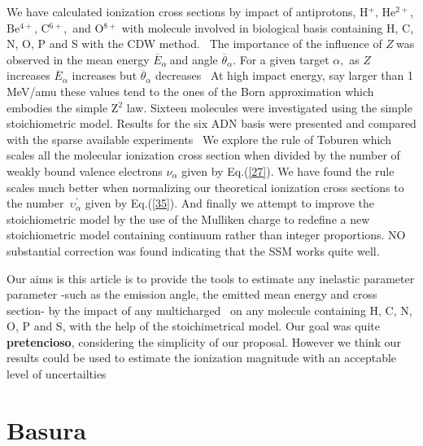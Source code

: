 \documentclass[preprint,showpacs,pra]{revtex4}
\begin{document}
We have calculated ionization cross sections by impact of antiprotons, H$^{+}
$, He$^{2+}$, Be$^{4+}$, C$^{6+}$,\ and O$^{8+}$ with molecule involved in
biological basis containing H, C, N, O, P and S with the CDW method. \ The
importance of the influence of $Z\ $was observed in the mean energy $%
\overline{E}_{\alpha }\ $and angle $\overline{\theta }_{\alpha }.$ For a
given target $\alpha ,$ as $Z$ increases $\overline{E}_{\alpha }$ increases
but $\overline{\theta }_{\alpha }$ decreases \ At high impact energy, say
larger than 1 MeV/amu these values tend to the ones of the Born
approximation which embodies the simple Z$^{2}$ law. Sixteen molecules were
investigated using the simple stoichiometric model. Results for the six ADN
basis were presented and compared with the sparse available experiments \ We
explore the rule of Toburen which scales all the molecular ionization cross
section when divided by the number of weakly bound valence electrons $\nu
_{\alpha }$ given by Eq.(\ref{27})$.$ We have found the rule scales much
better when normalizing our theoretical ionization cross sections to the
number\ $\upsilon _{\alpha }^{\prime }$ given by Eq.(\ref{35}). And finally
we attempt to improve the stoichiometric model by the use of the Mulliken
charge to redefine a new stoichiometric model containing continuum rather
than integer proportions. NO substantial correction was found indicating
that the SSM works quite well.

Our aims is this article is to provide the tools to estimate any inelastic
parameter parameter -such as the emission angle, the emitted mean energy and
cross section- by the impact of any multicharged \ on any molecule
containing H, C, N, O, P and S, with the help of the stoichimetrical model.
Our goal was quite \textbf{pretencioso}, considering the simplicity of our
proposal. However we think our results could be used to estimate the
ionization magnitude with an acceptable level of uncertailties

\bigskip

\section{Basura}
\end{document}
